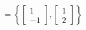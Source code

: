 \documentclass[preview]{standalone}
\begin{document}
\begin{align*}
= \left\{ \begin{bmatrix} 1 \\ -1 \end{bmatrix}, \begin{bmatrix} 1 \\ 2 \end{bmatrix} \right\}
\end{align*}
\end{document}
